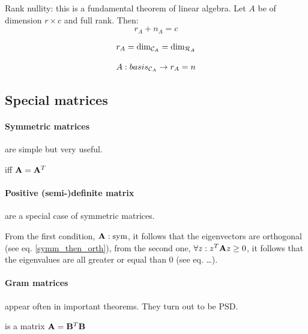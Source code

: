 \begin{theorem}
    Rank nullity: this is a fundamental theorem of linear algebra.
    Let $A$ be of dimension $r \times c$ and full rank.
    Then: 
    $$ r_A + n_A = c $$
\end{theorem}


\begin{theorem}
    $$ r_A = \text{dim}_{\mathcal{C}_{A}} = \text{dim}_{\mathcal{R}_{A}} $$
\end{theorem}

\begin{theorem}
    $$ A:basis_{\mathcal{C}_{A}} \to r_A = n $$
\end{theorem}






\subsection{Special matrices}

\paragraph{Symmetric matrices} are simple but very useful.
\begin{definition}
     iff $\mathbf{A} = \mathbf{A}^T$
\end{definition}


\paragraph{Positive (semi-)definite matrix} are a special case of symmetric matrices.
\begin{definition}
    From the first condition, $\mathbf{A}: \text{sym}$, it follows that the eigenvectors are orthogonal (see eq. \ref{symm_then_orth}), 
    from the second one, $\forall z: z^T \mathbf{A} z \geq 0$, it follows that the eigenvalues are all greater or equal than $0$ (see eq. \dots).
\end{definition}


\paragraph{Gram matrices} appear often in important theorems. They turn out to be PSD.
\begin{definition}
     is a matrix $\mathbf{A} = \mathbf{B}^T \mathbf{B}$
\end{definition}

